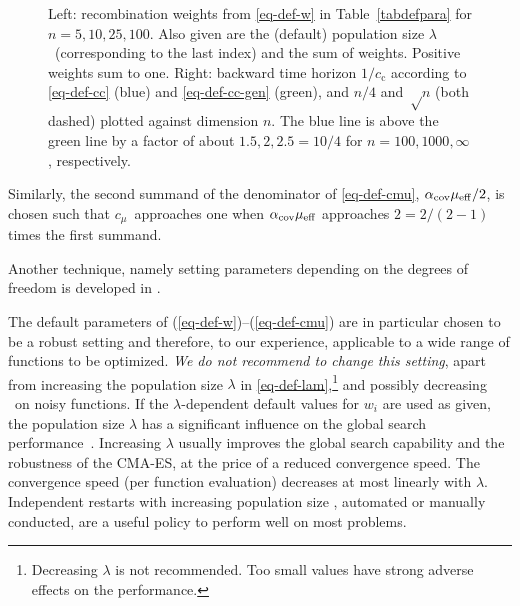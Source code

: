 \documentclass{article} %
\newcommand{\N}{\ensuremath{n}}
\newcommand{\cma}{CMA-ES}
\newcommand{\mueff}{\ensuremath{\mu_\mathrm{eff}}}
\newcommand{\lam}{\ensuremath{\lambda}}
\newcommand{\cc}{\ensuremath{c_\mathrm{c}}}
\newcommand{\cmu}{\ensuremath{c_\mu}}
\newcommand{\eqrefadd}[1]{(\ref{#1})} %
\newcommand{\eqsref}[1]{(\ref{#1})}
\begin{document}
\begin{appendix}
\begin{figure}[tb]
\begin{center}
 \vspace*{-0.3cm}
  \end{center}
%
  \caption[ccov]{\label{fig-cc-vs-dim} 
  Left: recombination weights from \eqref{eq-def-w} in Table~\ref{tabdefpara} for $\N=5, 10, 25, 100$. 
  Also given are the (default) population size \lam\ (corresponding to the last index) and the sum of weights. Positive weights sum to one. 
  Right: backward time horizon $1/\cc$ according to \eqref{eq-def-cc} (blue) and \eqref{eq-def-cc-gen} (green), and $\N/4$ and $\sqrt\N$ (both dashed) plotted against dimension \N. The blue line is above the green line by a factor of about $1.5, 2, 2.5=10/4$ for $\N=100, 1000, \infty$, respectively. }
\end{figure}
%

Similarly, the second summand of the denominator of \eqref{eq-def-cmu}, $\alphacov\mueff/2$, is chosen such that 
\cmu\ approaches one when $\alphacov\mueff$ approaches $2=2/(2-1)$ times the first summand.

Another technique, namely setting parameters depending on the degrees of freedom is developed in \cite{akimoto2020diagonal}.

The default parameters of
\eqsref{eq-def-w}--\eqrefadd{eq-def-cmu} are in particular chosen to be a
robust setting and therefore, to our experience, applicable to a wide
range of functions to be optimized. \emph{We do not recommend to change this
setting}, apart from increasing the population size $\lam$ in \eqref{eq-def-lam},\footnote{%
%
   Decreasing $\lam$ is not recommended. Too small values
   have strong adverse effects on the performance. }
%
 and possibly decreasing \alphacov\ on noisy functions.
 If the $\lam$-dependent default values for $w_i$ are used as given,
 the population size $\lam$ has a significant influence on the global
 search performance~\cite{Hansen:2004b}.  Increasing $\lam$ usually
 improves the global search capability and the robustness of the \cma,
 at the price of a reduced convergence speed. The convergence speed
 (per function evaluation) decreases at most linearly with $\lam$. Independent restarts with
 increasing population size \cite{Auger:2005a}, automated or manually
 conducted, are a useful policy to perform well on most problems.
%


\end{appendix}
\end{document}
